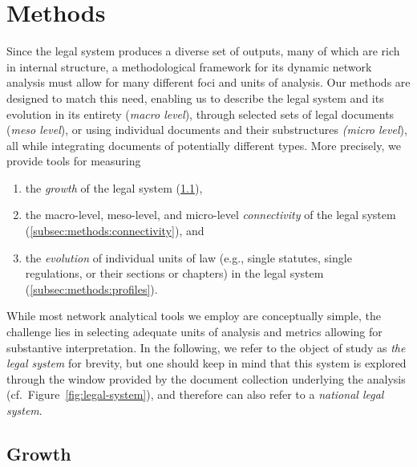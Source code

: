 \section{Methods}
\label{sec:methods}

Since the legal system produces a diverse set of outputs, many of which are rich in internal structure, a methodological framework for its dynamic network analysis must allow for many different foci and units of analysis. 
Our methods are designed to match this need, enabling us to describe the legal system and its evolution in its entirety (\emph{macro level}), through selected sets of legal documents (\emph{meso level}), or using individual documents and their substructures \emph{(micro level}), 
all while integrating documents of potentially different types.
More precisely, we provide tools for measuring 
\begin{enumerate}
	\item the \emph{growth} of the legal system (\ref{subsec:methods:growth}),
	\item the macro-level, meso-level, and micro-level \emph{connectivity} of the legal system (\ref{subsec:methods:connectivity}), and 
	\item the \emph{evolution} of individual units of law (e.g., single statutes, single regulations, or their sections or chapters) in the legal system (\ref{subsec:methods:profiles}).
\end{enumerate}
While most network analytical tools we employ are conceptually simple, the challenge lies in selecting adequate units of analysis and metrics allowing for substantive interpretation.
In the following, we refer to the object of study as \emph{the legal system} for brevity, 
but one should keep in mind that this system is explored through the window provided by the document collection underlying the analysis (cf.~Figure~\ref{fig:legal-system}), 
and therefore can also refer to a \emph{national legal system}.

\vspace*{6pt}
\subsection{Growth}
\label{subsec:methods:growth}

